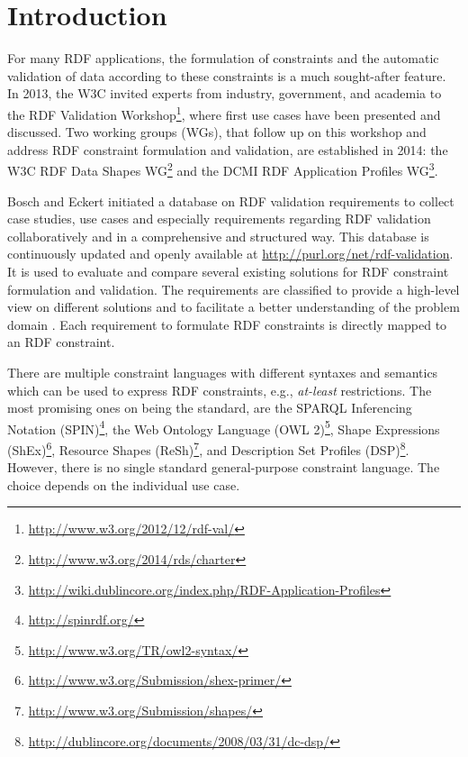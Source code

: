 \documentclass{llncs}
\newcommand{\tb}[1]{\todo[size=\small, color=green!40]{\textbf{Thomas:} #1}}
\begin{document}

\section{Introduction}

For many RDF applications, the formulation of constraints and the automatic validation of data according to these constraints is a much sought-after feature. 
In 2013, the W3C invited experts from industry, government, and academia to the RDF Validation Workshop\footnote{\url{http://www.w3.org/2012/12/rdf-val/}}, 
where first use cases have been presented and discussed. 
Two working groups (WGs),  that follow up on this workshop and address RDF constraint formulation and validation, are established in 2014: 
the W3C RDF Data Shapes WG\footnote{\url{http://www.w3.org/2014/rds/charter}} and the DCMI RDF Application Profiles WG\footnote{\url{http://wiki.dublincore.org/index.php/RDF-Application-Profiles}}. 

Bosch and Eckert \cite{BoschEckert2014} initiated a database on RDF validation requirements to collect case studies, use cases and especially requirements regarding RDF validation collaboratively and in a comprehensive and structured way. 
This database is continuously updated and openly available at \url{http://purl.org/net/rdf-validation}. It is used to evaluate and compare several existing solutions for RDF constraint formulation and validation. 
The requirements are classified to provide a high-level view on different solutions and to facilitate a better understanding of the problem domain \cite{BoschEckert2014}.  
Each requirement to formulate RDF constraints is directly mapped to an RDF constraint.

There are multiple constraint languages with different syntaxes and semantics which can be used to express RDF constraints, e.g., \emph{at-least} restrictions.
The most promising ones on being the standard, are
the SPARQL Inferencing Notation (SPIN)\footnote{\url{http://spinrdf.org/}}, 
the Web Ontology Language (OWL 2)\footnote{\url{http://www.w3.org/TR/owl2-syntax/}}, 
Shape Expressions (ShEx)\footnote{\url{http://www.w3.org/Submission/shex-primer/}}, 
Resource Shapes (ReSh)\footnote{\url{http://www.w3.org/Submission/shapes/}}, 
and Description Set Profiles (DSP)\footnote{\url{http://dublincore.org/documents/2008/03/31/dc-dsp/}}.
However, there is no single standard general-purpose constraint language.
The choice depends on the individual use case.
\end{document}
